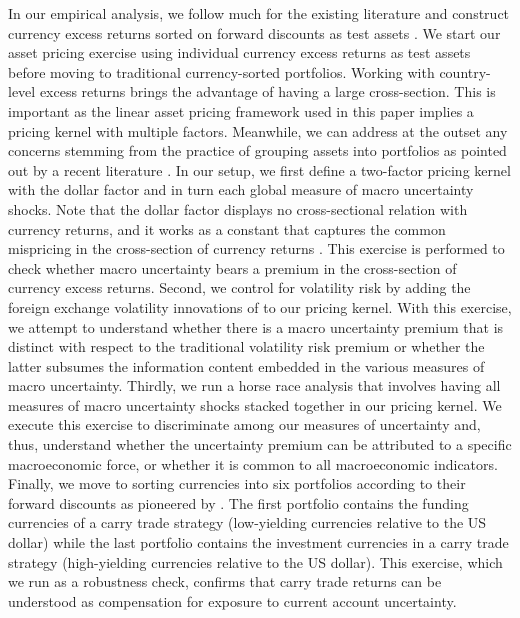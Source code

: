 In our empirical analysis, we follow much for the existing literature and construct currency excess returns sorted on forward discounts as test assets  \citep{lustig_verdelhan2007,lustig_etal2011}. We start our asset pricing exercise using individual currency excess returns as test assets before moving to traditional currency-sorted portfolios. Working with country-level excess returns brings the advantage of having a large cross-section. This is important as the linear asset pricing framework used in this paper implies a pricing kernel with multiple factors. Meanwhile, we can address at the outset any concerns stemming from the practice of grouping assets into portfolios as pointed out by a recent literature \citep[e.g.,][]{lewellenetal:10-jfe,ALS/2010}. In our setup, we first define a two-factor pricing kernel with the dollar factor and in turn each global measure of macro uncertainty shocks. Note that the dollar factor displays no cross-sectional relation with currency returns, and it works as a constant that captures the common mispricing in the cross-section of currency returns \citep{lustig_etal2011}. This exercise is performed to check whether macro uncertainty bears a premium in the cross-section of currency excess returns. Second, we control for volatility risk by adding the foreign exchange volatility innovations of \citet{menkhoff_etal2012} to our pricing kernel. With this exercise, we attempt to understand whether there is a macro uncertainty premium that is distinct with respect to the traditional volatility risk premium or whether the latter subsumes the information content embedded in the various measures of macro uncertainty. Thirdly, we run a horse race analysis that involves having all measures of macro uncertainty shocks stacked together in our pricing kernel. We execute this exercise to discriminate among our measures of uncertainty and, thus, understand whether the uncertainty premium can be attributed to a specific macroeconomic force, or whether it is common to all macroeconomic indicators. Finally, we move to sorting currencies into six portfolios according to their forward discounts as pioneered by \citet{lustig_verdelhan2007}. The first portfolio contains the funding currencies of a carry trade strategy (low-yielding currencies relative to the US dollar) while the last portfolio contains the investment currencies in a carry trade strategy (high-yielding currencies relative to the US dollar). This exercise, which we run as a robustness check, confirms that carry trade returns can be understood as compensation for exposure to current account uncertainty.

